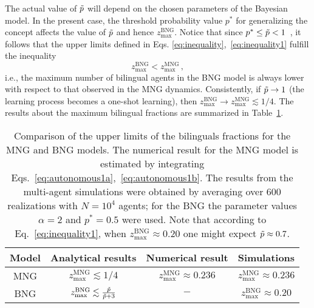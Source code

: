 \documentclass[review]{elsarticle}
\newcommand{\zmax}{z_\mathrm{max}}
\newcommand{\tp}{\Tilde{p}}
\newcommand{\+}{\! + \!}
\begin{document}
The actual value of $\tp$ will depend on the chosen parameters of the Bayesian model. 
In the present case, the threshold probability value $p^*$ for generalizing the concept affects the value of $\tp$ and hence $\zmax^\mathrm{BNG}$.
%
Notice that since $p^* \leq \tp < 1$~\cite{Marchetti-2020a}, it follows that the upper limits defined in Eqs. \eqref{eq:inequality},~\eqref{eq:inequality1} fulfill the inequality
%
\begin{equation}
    \label{eq:inequality2}
    \zmax^\mathrm{BNG} < \zmax^\mathrm{MNG}  \, ,
\end{equation}
%
i.e., the maximum number of bilingual agents in the BNG model is always lower with respect to that observed in the MNG dynamics. 
Consistently, if $\tp \rightarrow 1$ (the learning process becomes a one-shot learning), then $\zmax^\mathrm{BNG} \to \zmax^\mathrm{MNG} \lesssim 1/4$.
The results about the maximum bilingual fractions are summarized in Table~\ref{table:table2}.

%
\begin{table}
\renewcommand{\arraystretch}{2} 
\caption{Comparison of the upper limits of the bilinguals fractions for the MNG and BNG models.
The numerical result for the MNG model is estimated by integrating Eqs.~\eqref{eq:autonomous1a},~\eqref{eq:autonomous1b}. 
The results from the multi-agent simulations were obtained by averaging over $600$ realizations with $N=10^{4}$ agents; for the BNG the parameter values $\alpha=2$ and $p^* = 0.5$ were used. 
Note that according to Eq.~\eqref{eq:inequality1}, when  $\zmax^\mathrm{BNG}  \approx 0.20 $ one might expect $\tp \approx 0.7$. }
\label{table:table2}
    \begin{tabular}{c | c c c   }
    Model & Analytical results & Numerical result  & Simulations \\ [1ex]
    \hline
    MNG     &  $\zmax^\mathrm{MNG}  \lesssim 1/4$         & $\zmax^\mathrm{MNG}  \approx 0.236 $        & $\zmax^\mathrm{MNG}  \approx 0.236 $     \\

    BNG    &     $\zmax^\mathrm{BNG}  \lesssim \frac{\tp}{\tp + 3}$    & $-$         & $\zmax^\mathrm{BNG}  \approx 0.20 $      \\ [1ex]
    \end{tabular}
\end{table}
%
\end{document}

